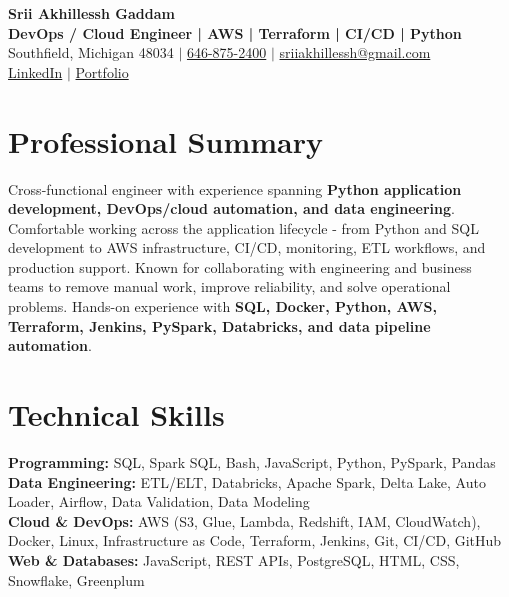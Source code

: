 \documentclass[letterpaper,10pt]{article}
\begin{document}
\fontsize{9.35pt}{10.45pt}\selectfont

\begin{center}
    {\LARGE \textbf{Srii Akhillessh Gaddam}} \\[-1pt]
    \textbf{DevOps / Cloud Engineer | AWS | Terraform | CI/CD | Python} \\[2pt]
    Southfield, Michigan 48034 $|$
    \href{tel:6468752400}{646-875-2400} $|$
    \href{mailto:sriiakhillessh@gmail.com}{sriiakhillessh@gmail.com} \\[1pt]
    \href{https://www.linkedin.com/in/srii-akhiilessh-gaddam-b48668191/}{LinkedIn} $|$
    \href{https://sriiakhillesshg.github.io/portfolio/}{Portfolio}
\end{center}
\vspace{-8pt}

\section{Professional Summary}
\small{Cross-functional engineer with experience spanning \textbf{Python application development, DevOps/cloud automation, and data engineering}. Comfortable working across the application lifecycle - from Python and SQL development to AWS infrastructure, CI/CD, monitoring, ETL workflows, and production support. Known for collaborating with engineering and business teams to remove manual work, improve reliability, and solve operational problems. Hands-on experience with \textbf{SQL, Docker, Python, AWS, Terraform, Jenkins, PySpark, Databricks, and data pipeline automation}.}

\section{Technical Skills}
\small{
\textbf{Programming:} SQL, Spark SQL, Bash, JavaScript, Python, PySpark, Pandas \\
\textbf{Data Engineering:} ETL/ELT, Databricks, Apache Spark, Delta Lake, Auto Loader, Airflow, Data Validation, Data Modeling \\
\textbf{Cloud \& DevOps:} AWS (S3, Glue, Lambda, Redshift, IAM, CloudWatch), Docker, Linux, Infrastructure as Code, Terraform, Jenkins, Git, CI/CD, GitHub \\
\textbf{Web \& Databases:} JavaScript, REST APIs, PostgreSQL, HTML, CSS, Snowflake, Greenplum
}
\end{document}
